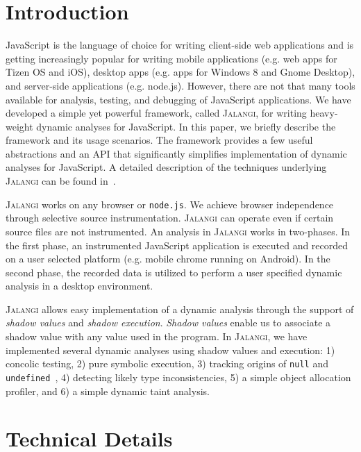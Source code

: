 \documentclass{sig-alternate}
\def\jalangi{\textsc{Jalangi}}
\begin{document}
\section{Introduction}

JavaScript is the language of choice for writing client-side web
applications and is getting increasingly popular for writing mobile
applications (e.g. web apps for Tizen OS and iOS), desktop apps
(e.g. apps for Windows 8 and Gnome Desktop), and server-side
applications (e.g. node.js).  However, there are not that many tools
available for analysis, testing, and debugging of JavaScript
applications.  We have developed a simple yet powerful framework,
called \jalangi{}, for writing heavy-weight dynamic analyses for
JavaScript.  In this paper, we briefly describe the framework and its
usage scenarios.  The framework provides a few useful abstractions and
an API that significantly simplifies implementation of dynamic
analyses for JavaScript.  A detailed description of the techniques
underlying \jalangi{} can be found in~\cite{SBGKfse13}.

\jalangi{} works on any browser or \texttt{node.js}.  We achieve
browser independence through selective source
instrumentation. \jalangi{} can operate even if certain source files
are not instrumented.  An analysis in \jalangi{} works in two-phases.
In the first phase, an instrumented JavaScript application is executed
and recorded on a user selected platform (e.g. mobile chrome running
on Android).  In the second phase, the recorded data is utilized to
perform a user specified dynamic analysis in a desktop environment.

\jalangi{} allows easy implementation of a dynamic analysis through
the support of \emph{shadow values} and \emph{shadow execution}.
\emph{Shadow values} enable us to associate a shadow value with any
value used in the program.  In \jalangi{}, we have implemented several
dynamic analyses using shadow values and execution: 1) concolic
testing, 2) pure symbolic execution, 3) tracking origins of
\texttt{null} and
\texttt{undefined}~\cite{Bond:2007:TBA:1297027.1297057}, 4) detecting
likely type inconsistencies, 5) a simple object allocation profiler,
and 6) a simple dynamic taint analysis.

\section{Technical Details}
\label{sec:technical-details}
\end{document}
